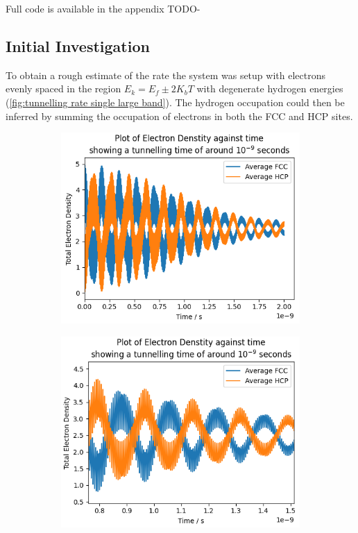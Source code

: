 Full code is available in the appendix TODO-






\subsection{Initial Investigation}
To obtain a rough estimate of
the rate the system was setup
with electrons evenly spaced
in the region \(E_k = E_f \pm 2K_b T\)
with degenerate hydrogen energies (\cref{fig:tunnelling rate single large band}).
The hydrogen occupation
could then be inferred by
summing the occupation
of electrons in both the FCC and
HCP sites.
\begin{figure}[htbp]
    \centering
    \begin{subfigure}{0.45\linewidth}
        \includegraphics[width=0.9\linewidth]{Figures/Simulation/Plot of large band simulation decay times.png}
        \label{fig:large band degenerate simulation}
    \end{subfigure}
    \hfill
    \begin{subfigure}{0.45\linewidth}
        \includegraphics[width=0.9\linewidth]{Figures/Simulation/Plot of large band simulation decay times rapid oscillations.png }

\end{subfigure}
\end{figure}

